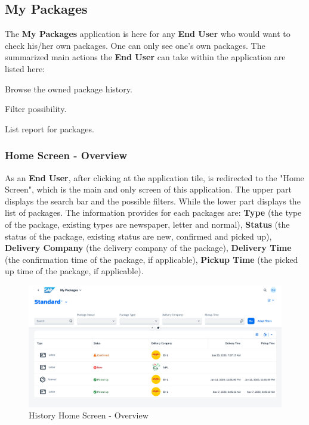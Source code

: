 % 

\subsection{My Packages}
\label{subsec:ph}

The \textbf{My Packages} application is here for any \textbf{End User} who would want to check his/her own packages. One can only see one's own packages. 
The summarized main actions the \textbf{End User} can take within the application are listed here:

\begin{compactenum}
	\item Browse the owned package history.
        \begin{compactenum}
        	\item Filter possibility.
            \item List report for packages.
        \end{compactenum}
\end{compactenum}

\subsubsection{Home Screen - Overview}
As an \textbf{End User}, after clicking at the application tile, is redirected to the "Home Screen", which is the main and only screen of this application. The upper part displays the search bar and the possible filters. While the lower part displays the list of packages. The information provides for each packages are: \textbf{Type} (the type of the package, existing types are newspaper, letter and normal), \textbf{Status} (the status of the package, existing status are new, confirmed and picked up), \textbf{Delivery Company} (the delivery company of the package), \textbf{Delivery Time} (the confirmation time of the package, if applicable), \textbf{Pickup Time} (the picked up time of the package, if applicable).

\begin{figure}[H]
	\centering
	\includegraphics[width=1\linewidth]{images/user_doc/myPack/overview.png}
	\caption{History Home Screen - Overview}
	\label{fig:HistoryHome}
\end{figure}

